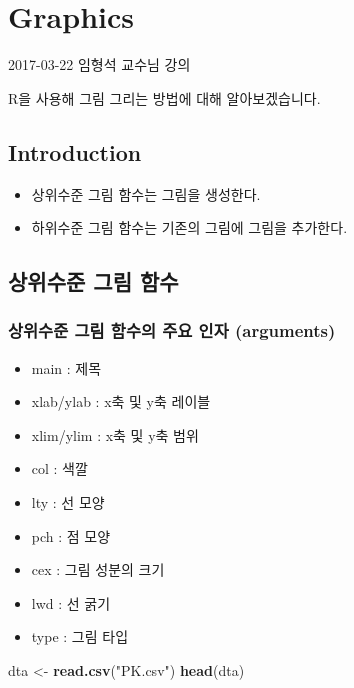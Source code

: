 \documentclass[12pt,]{krantz}
\makeatletter
\newenvironment{Shaded}{\begin{snugshade}}{\end{snugshade}}
\newcommand{\KeywordTok}[1]{\textcolor[rgb]{0.13,0.29,0.53}{\textbf{#1}}}
\newcommand{\StringTok}[1]{\textcolor[rgb]{0.31,0.60,0.02}{#1}}
\newcommand{\NormalTok}[1]{#1}
\providecommand{\tightlist}{%
  \setlength{\itemsep}{0pt}\setlength{\parskip}{0pt}}
\renewenvironment{quote}{\begin{VF}}{\end{VF}}
\newenvironment{kframe}{%
\medskip{}
\setlength{\fboxsep}{.8em}
 \def\at@end@of@kframe{}%
 \ifinner\ifhmode%
  \def\at@end@of@kframe{\end{minipage}}%
  \begin{minipage}{\columnwidth}%
 \fi\fi%
 \def\FrameCommand##1{\hskip\@totalleftmargin \hskip-\fboxsep
 \colorbox{shadecolor}{##1}\hskip-\fboxsep
     \hskip-\linewidth \hskip-\@totalleftmargin \hskip\columnwidth}%
 \MakeFramed {\advance\hsize-\width
   \@totalleftmargin\z@ \linewidth\hsize
   \@setminipage}}%
 {\par\unskip\endMakeFramed%
 \at@end@of@kframe}
\renewenvironment{Shaded}{\begin{kframe}}{\end{kframe}}
\theoremstyle{definition}
\theoremstyle{definition}
\theoremstyle{remark}
\makeatother
\begin{document}
\chapter{Graphics}\label{graphics}

\begin{quote}
2017-03-22 임형석 교수님 강의
\end{quote}

R을 사용해 그림 그리는 방법에 대해 알아보겠습니다.

\section{Introduction}\label{introduction}

\begin{itemize}
\tightlist
\item
  상위수준 그림 함수는 그림을 생성한다.
\item
  하위수준 그림 함수는 기존의 그림에 그림을 추가한다.
\end{itemize}

\section{상위수준 그림 함수}\label{upper}

\subsection{상위수준 그림 함수의 주요 인자
(arguments)}\label{-----arguments}

\begin{itemize}
\tightlist
\item
  main : 제목
\item
  xlab/ylab : x축 및 y축 레이블
\item
  xlim/ylim : x축 및 y축 범위
\item
  col : 색깔
\item
  lty : 선 모양
\item
  pch : 점 모양
\item
  cex : 그림 성분의 크기
\item
  lwd : 선 굵기
\item
  type : 그림 타입
\end{itemize}

\begin{Shaded}
\begin{Highlighting}[]
\NormalTok{dta <-}\StringTok{ }\KeywordTok{read.csv}\NormalTok{(}\StringTok{"PK.csv"}\NormalTok{)}
\KeywordTok{head}\NormalTok{(dta)}
\end{Highlighting}
\end{Shaded}
\end{document}
